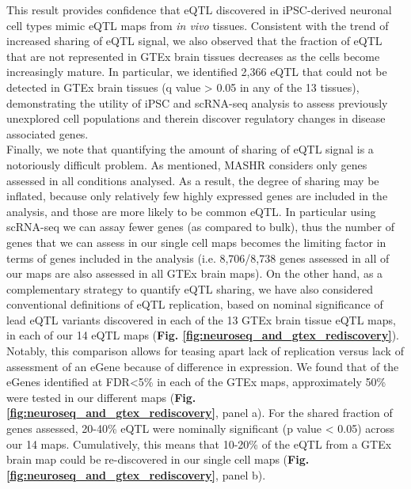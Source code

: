 This result provides confidence that eQTL discovered in iPSC-derived neuronal cell types mimic eQTL maps from \textit{in vivo} tissues. 
Consistent with the trend of increased sharing of eQTL signal, we also observed that the fraction of eQTL that are not represented in GTEx brain tissues decreases as the cells become increasingly mature. 
In particular, we identified 2,366 eQTL that could not be detected in GTEx brain tissues (q value > 0.05 in any of the 13 tissues), demonstrating the utility of iPSC and scRNA-seq analysis to assess previously unexplored cell populations and therein discover regulatory changes in disease associated genes. \\

Finally, we note that quantifying the amount of sharing of eQTL signal is a notoriously difficult problem.
As mentioned, MASHR considers only genes assessed in all conditions analysed. 
As a result, the degree of sharing may be inflated, because only relatively few highly expressed genes are included in the analysis, and those are more likely to be common eQTL. 
In particular using scRNA-seq we can assay fewer genes (as compared to bulk), thus the number of genes that we can assess in our single cell maps becomes the limiting factor in terms of genes included in the analysis (i.e. 8,706/8,738 genes assessed in all of our maps are also assessed in all GTEx brain maps).
On the other hand, as a complementary strategy to quantify eQTL sharing, we have also considered conventional definitions of eQTL replication, based on nominal significance of lead eQTL variants discovered in each of the 13 GTEx brain tissue eQTL maps, in each of our 14 eQTL maps (\textbf{Fig. \ref{fig:neuroseq_and_gtex_rediscovery}}).
Notably, this comparison allows for teasing apart lack of replication versus lack of assessment of an eGene because of difference in expression. We found that of the eGenes identified at FDR<5\% in each of the GTEx maps, approximately 50\% were tested in our different maps (\textbf{Fig. \ref{fig:neuroseq_and_gtex_rediscovery}}, panel a).
For the shared fraction of genes assessed, 20-40\% eQTL were nominally significant (p value < 0.05) across our 14 maps.
Cumulatively, this means that 10-20\% of the eQTL from a GTEx brain map could be re-discovered in our single cell maps (\textbf{Fig. \ref{fig:neuroseq_and_gtex_rediscovery}}, panel b).

